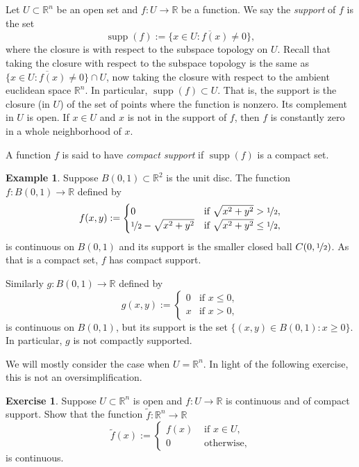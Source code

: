 \documentclass[12pt]{book}
\newcommand{\supp}{\operatorname{supp}}
\newcommand{\R}{{\mathbb{R}}}
\newcommand{\myindex}[1]{#1\index{#1}}
\theoremstyle{plain}
\theoremstyle{remark}
\theoremstyle{definition}
\theoremstyle{exercise}
\newtheorem{exercise}{Exercise}[section]
\theoremstyle{example}
\newtheorem{example}[thm]{Example}
\begin{document}
Let $U \subset \R^n$ be an open set and
$f \colon U \to \R$ be a function.  We say the
\emph{\myindex{support}} of $f$ is the set
\begin{equation*}
\operatorname{supp} (f) :=
\overline{
\{ x \in U : f(x) \not= 0 \}
} ,
\end{equation*}
where the closure is with respect to the subspace topology on $U$.
Recall that taking the closure with respect to the subspace
topology is the same as 
$\overline{
\{ x \in U : f(x) \not= 0 \}
} \cap U$, now taking the closure with respect to the ambient euclidean space
$\R^n$.
In particular,
$\operatorname{supp} (f) \subset U$.
That is, the support is the closure (in $U$) of the set of points where the
function is nonzero.  Its complement in $U$ is open.
If $x \in U$ and $x$ is not in the support of $f$,
then
$f$ is constantly zero in a whole neighborhood of $x$.

A function $f$ is said to have \emph{\myindex{compact support}}
if $\supp(f)$ is a compact set.

\begin{example}
Suppose $B(0,1) \subset \R^2$ is the unit disc.
The function $f \colon B(0,1) \to \R$ defined by
\begin{equation*}
f(x,y) :=
\begin{cases}
0 & \text{if $\sqrt{x^2+y^2} > \nicefrac{1}{2}$}, \\
\nicefrac{1}{2} - \sqrt{x^2+y^2} & \text{if $\sqrt{x^2+y^2} \leq \nicefrac{1}{2}$},
\end{cases}
\end{equation*}
is continuous on $B(0,1)$ and its support is the smaller closed ball
$C(0,\nicefrac{1}{2})$.  As that is a compact set, $f$ has compact support.

Similarly $g \colon B(0,1) \to \R$ defined by
\begin{equation*}
g(x,y) :=
\begin{cases}
0 & \text{if $x \leq 0$}, \\
x & \text{if $x > 0$},
\end{cases}
\end{equation*}
is continuous on $B(0,1)$, but its support is the set
$\{ (x,y) \in B(0,1) : x \geq 0 \}$.  In particular, $g$ is not compactly
supported.
\end{example}

We will mostly consider the case when $U=\R^n$.  In light of the following
exercise, this is not an oversimplification.

\begin{exercise}
Suppose $U \subset \R^n$ is open and $f \colon U \to \R$ is continuous and
of compact support.  Show that the function $\widetilde{f} \colon \R^n \to \R$
\begin{equation*}
\widetilde{f}(x) :=
\begin{cases}
f(x) & \text{ if $x \in U$,} \\
0 & \text{ otherwise,}
\end{cases}
\end{equation*}
is continuous.
\end{exercise}
\end{document}
